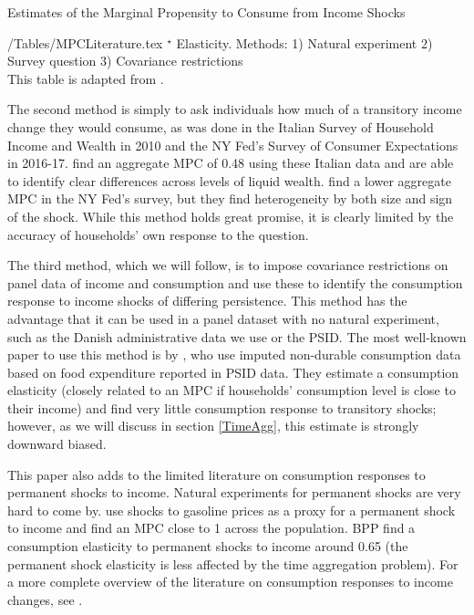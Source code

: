 \documentclass[titlepage]{\econtex}\newcommand{\texname}{ConsumptionHeterogeneity}
\begin{document}
\begin{sidewaystable} \small
	\caption{Estimates of the Marginal Propensity to Consume from Income Shocks}
	\label{table:MPCLiterature}
	\begin{minipage}{\textwidth}
		\econtexRoot/Tables/MPCLiterature.tex 
		\footnotesize{$^{\star}$ Elasticity. Methods: 1) Natural experiment 2) Survey question 3) Covariance restrictions \\
		This table is adapted from \cite{carroll_distribution_2017}.}
	\end{minipage}
\end{sidewaystable}

The second method is simply to ask individuals how much of a transitory income change they would consume, as was done in the Italian Survey of Household Income and Wealth in 2010 and the NY Fed's Survey of Consumer Expectations in 2016-17. \cite{jappelli_fiscal_2014} find an aggregate MPC of 0.48 using these Italian data and are able to identify clear differences across levels of liquid wealth. \cite{fuster_what_2018} find a lower aggregate MPC in the NY Fed's survey, but they find heterogeneity by both size and sign of the shock. While this method holds great promise, it is clearly limited by the accuracy of households' own response to the question.

The third method, which we will follow, is to impose covariance restrictions on panel data of income and consumption and use these to identify the consumption response to income shocks of differing persistence. This method has the advantage that it can be used in a panel dataset with no natural experiment, such as the Danish administrative data we use or the PSID. The most well-known paper to use this method is by \cite{blundell_consumption_2008}, who use imputed non-durable consumption data based on food expenditure reported in PSID data. They estimate a consumption elasticity (closely related to an MPC if households' consumption level is close to their income) and find very little consumption response to transitory shocks; however, as we will discuss in section \ref{TimeAgg}, this estimate is strongly downward biased.

This paper also adds to the limited literature on consumption responses to permanent shocks to income. Natural experiments for permanent shocks are very hard to come by. \cite{gelman_response_2016} use shocks to gasoline prices as a proxy for a permanent shock to income and find an MPC close to 1 across the population. BPP find a consumption elasticity to permanent shocks to income around 0.65 (the permanent shock elasticity is less affected by the time aggregation problem). For a more complete overview of the literature on consumption responses to income changes, see \cite{jappelli_consumption_2010}.
\end{document}
